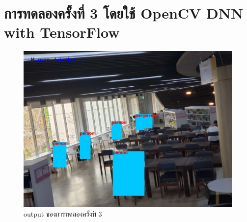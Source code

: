 \section{การทดลองครั้งที่ 3 โดยใช้ OpenCV DNN with TensorFlow}
\begin{figure}[ht]
\centering
\includegraphics[scale=0.25]{images/dnn_output.jpg}
\caption[output3]{output ของการทดลองครั้งที่ 3}
\label{fig:output3}
\end{figure}
